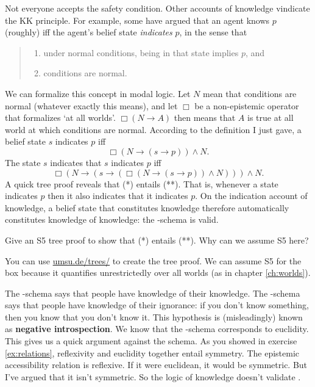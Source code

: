 Not everyone accepts the safety condition. Other accounts of knowledge vindicate
the KK principle. For example, some have argued that an agent knows $p$
(roughly) iff the agent's belief state \emph{indicates} $p$, in the sense that
%
\begin{quote}
\begin{enumerate}
\item[(1)] under normal conditions, being in that state implies $p$, and
\item[(2)] conditions are normal.
\end{enumerate}
\end{quote}
% 
We can formalize this concept in modal logic. Let $N$ mean that conditions are
normal (whatever exactly this means), and let $\Box$ be a non-epistemic operator
that formalizes `at all worlds'. $\Box(N \to A)$ then means that $A$ is true at
all world at which conditions are normal. According to the definition I just
gave, a belief state $s$ indicates $p$ iff
\begin{equation}\tag{*}
  \Box(N \to (s\to p)) \land N.
\end{equation}
The state $s$ indicates that $s$ indicates $p$ iff
\begin{equation}\tag{**}
  \Box(N \to (s \to (\Box(N \to (s \to p)) \land N))) \land N.
\end{equation}
A quick tree proof reveals that (*) entails (**). That is, whenever a state
indicates $p$ then it also indicates that it indicates $p$. On the indication
account of knowledge, a belief state that constitutes knowledge therefore
automatically constitutes knowledge of knowledge: the -schema is valid.

\begin{exercise}
  Give an S5 tree proof to show that (*) entails (**). Why can we
  assume S5 here?
\end{exercise}
\begin{solution}
  You can use
  \href{https://www.umsu.de/trees/}{umsu.de/trees/} to
  create the tree proof. We can assume S5 for the box because it quantifies
  unrestrictedly over all worlds (as in chapter \ref{ch:worlds}).
\end{solution}

The -schema says that people have knowledge of their knowledge. The
-schema says that people have knowledge of their ignorance: if you don't
know something, then you know that you don't know it. This hypothesis is
(misleadingly) known as \textbf{negative introspection}.
%
%
We know that the -schema corresponds to euclidity. This gives us a quick
argument against the schema. As you showed in exercise \ref{ex:relations},
reflexivity and euclidity together entail symmetry. The epistemic accessibility
relation is reflexive. If it were euclidean, it would be symmetric. But I've
argued that it isn't symmetric. So the logic of knowledge doesn't validate
.

